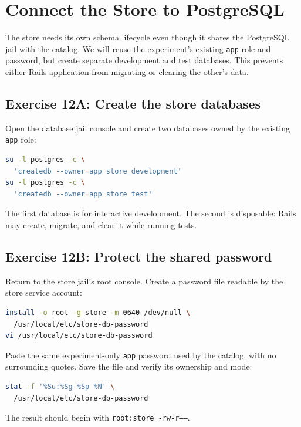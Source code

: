 \chapter{Connect the Store to PostgreSQL}

The store needs its own schema lifecycle even though it shares the PostgreSQL
jail with the catalog. We will reuse the experiment's existing \texttt{app}
role and password, but create separate development and test databases. This
prevents either Rails application from migrating or clearing the other's data.

\section{Exercise 12A: Create the store databases}

Open the database jail console and create two databases owned by the existing
\texttt{app} role:

\begin{lstlisting}[language=sh]
su -l postgres -c \
  'createdb --owner=app store_development'
su -l postgres -c \
  'createdb --owner=app store_test'
\end{lstlisting}

The first database is for interactive development. The second is disposable:
Rails may create, migrate, and clear it while running tests.

\section{Exercise 12B: Protect the shared password}

Return to the store jail's root console. Create a password file readable by the
store service account:

\begin{lstlisting}[language=sh]
install -o root -g store -m 0640 /dev/null \
  /usr/local/etc/store-db-password
vi /usr/local/etc/store-db-password
\end{lstlisting}

Paste the same experiment-only \texttt{app} password used by the catalog, with
no surrounding quotes. Save the file and verify its ownership and mode:

\begin{lstlisting}[language=sh]
stat -f '%Su:%Sg %Sp %N' \
  /usr/local/etc/store-db-password
\end{lstlisting}

The result should begin with \texttt{root:store -rw-r-----}.

